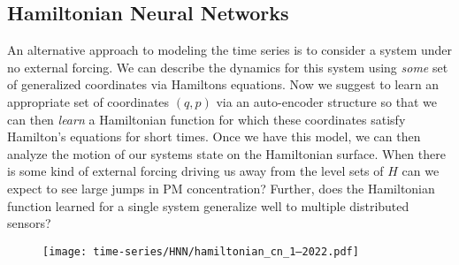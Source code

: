 \subsection{Hamiltonian Neural Networks}

An alternative approach to modeling the time series is to consider a system under no external forcing. We can describe the dynamics for this system using \textit{some} set of generalized coordinates via Hamiltons equations. Now we suggest to learn an appropriate set of coordinates $(q,p)$ via an auto-encoder structure so that we can then \textit{learn} a Hamiltonian function for which these coordinates satisfy Hamilton's equations for short times. Once we have this model, we can then analyze the motion of our systems state on the Hamiltonian surface. When there is some kind of external forcing driving us away from the level sets of $H$ can we expect to see large jumps in PM concentration? Further, does the Hamiltonian function learned for a single system generalize well to multiple distributed sensors?

\begin{figure}[h]
  \centering
  \texttt{[image: time-series/HNN/hamiltonian\_cn\_1--2022.pdf]}
\end{figure}








